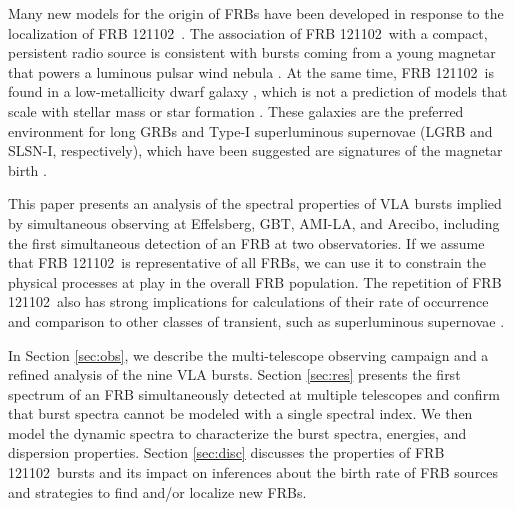 \documentclass[twocolumn]{aastex61}
\newcommand{\frb}{FRB 121102}
\begin{document}
Many new models for the origin of FRBs have been developed in response to the localization of \frb\ \citep{2017arXiv170104815K, 2017arXiv170102370M, 2017arXiv170104094Z, 2017arXiv170102492D, 2017arXiv170208644B, 2017arXiv170300393T}. The association of \frb\ with a compact, persistent radio source is consistent with bursts coming from a young magnetar that powers a luminous pulsar wind nebula \citep{2017arXiv170104815K}. At the same time, \frb\ is found in a low-metallicity dwarf galaxy \citep{OPT, 2017arXiv170102370M}, which is not a prediction of models that scale with stellar mass or star formation \citep{2017arXiv170400022N}. These galaxies are the preferred environment for long GRBs and Type-I superluminous supernovae (LGRB and SLSN-I, respectively), which have been suggested are signatures of the magnetar birth \citep{2008AJ....135.1136M, 2014ApJ...787..138L}.


This paper presents an analysis of the spectral properties of VLA bursts implied by simultaneous observing at Effelsberg, GBT, AMI-LA, and Arecibo, including the first simultaneous detection of an FRB at two observatories. If we assume that \frb\ is representative of all FRBs, we can use it to constrain the physical processes at play in the overall FRB population. The repetition of \frb\ also has strong implications for calculations of their rate of occurrence \citep{2016MNRAS.458L..89C} and comparison to other classes of transient, such as superluminous supernovae \citep{OPT}.

In Section \ref{sec:obs}, we describe the multi-telescope observing campaign and a refined analysis of the nine VLA bursts. Section \ref{sec:res} presents the first spectrum of an FRB simultaneously detected at multiple telescopes and confirm that burst spectra cannot be modeled with a single spectral index. We then model the dynamic spectra to characterize the burst spectra, energies, and dispersion properties. Section \ref{sec:disc} discusses the properties of \frb\ bursts and its impact on inferences about the birth rate of FRB sources and strategies to find and/or localize new FRBs.
\end{document}
